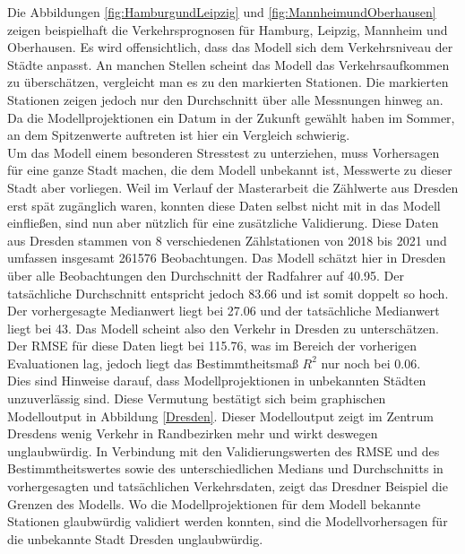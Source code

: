 \documentclass[a4paper,12pt]{thesis}
\begin{document}
Die Abbildungen \ref{fig:HamburgundLeipzig} und \ref{fig:MannheimundOberhausen} zeigen beispielhaft die Verkehrsprognosen für Hamburg, Leipzig, Mannheim und Oberhausen. Es wird offensichtlich, dass das Modell sich dem Verkehrsniveau der Städte anpasst. An manchen Stellen scheint das Modell das Verkehrsaufkommen zu überschätzen, vergleicht man es zu den markierten Stationen. Die markierten Stationen zeigen jedoch nur den Durchschnitt über alle Messnungen hinweg an. Da die Modellprojektionen ein Datum in der Zukunft gewählt haben im Sommer, an dem Spitzenwerte auftreten ist hier ein Vergleich schwierig.\\
Um das Modell einem besonderen Stresstest zu unterziehen, muss Vorhersagen für eine ganze Stadt machen, die dem Modell unbekannt ist, Messwerte zu dieser Stadt aber vorliegen. Weil im Verlauf der Masterarbeit die Zählwerte aus Dresden erst spät zugänglich waren, konnten diese Daten selbst nicht mit in das Modell einfließen, sind nun aber nützlich für eine zusätzliche Validierung. Diese Daten aus Dresden stammen von 8 verschiedenen Zählstationen von 2018 bis 2021 und umfassen insgesamt 261576 Beobachtungen. Das Modell schätzt hier in Dresden über alle Beobachtungen den Durchschnitt der Radfahrer auf 40.95. Der tatsächliche Durchschnitt entspricht jedoch 83.66 und ist somit doppelt so hoch. Der vorhergesagte Medianwert liegt bei 27.06 und der tatsächliche Medianwert liegt bei 43. Das Modell scheint also den Verkehr in Dresden zu unterschätzen. Der RMSE für diese Daten liegt bei 115.76, was im Bereich der vorherigen Evaluationen lag, jedoch liegt das Bestimmtheitsmaß $R^2$ nur noch bei 0.06.\\
Dies sind Hinweise darauf, dass Modellprojektionen in unbekannten Städten unzuverlässig sind. Diese Vermutung bestätigt sich beim graphischen Modelloutput in Abbildung \ref{Dresden}. Dieser Modelloutput zeigt im Zentrum Dresdens wenig Verkehr in Randbezirken mehr und wirkt deswegen unglaubwürdig. In Verbindung mit den Validierungswerten des RMSE und des Bestimmtheitswertes sowie des unterschiedlichen Medians und Durchschnitts in vorhergesagten und tatsächlichen Verkehrsdaten, zeigt das Dresdner Beispiel die Grenzen des Modells. Wo die Modellprojektionen für dem Modell bekannte Stationen glaubwürdig validiert werden konnten, sind die Modellvorhersagen für die unbekannte Stadt Dresden unglaubwürdig.
\end{document}
